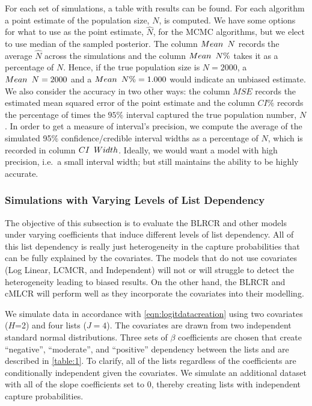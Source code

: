 \documentclass[
  12pt,
]{article}
\begin{document}
For each set of simulations, a table with results can be found. For each
algorithm a point estimate of the population size, \(N\), is computed.
We have some options for what to use as the point estimate, \(\hat{N}\),
for the MCMC algorithms, but we elect to use median of the sampled
posterior. The column \({Mean}\hspace{5px}{N}\) records the average
\(\hat{N}\) across the simulations and the column
\({Mean}\hspace{5px}{N}\%\) takes it as a percentage of \(N\). Hence, if
the true population size is \(N=2000\), a
\({Mean}\hspace{5px}{N} = 2000\) and a
\({Mean}\hspace{5px}{N}\%= 1.000\) would indicate an unbiased estimate.
We also consider the accuracy in two other ways: the column \(MSE\)
records the estimated mean squared error of the point estimate and the
column \(CI \%\) records the percentage of times the \(95\%\) interval
captured the true population number, \(N\). In order to get a measure of
interval's precision, we compute the average of the simulated 95\(\%\)
confidence/credible interval widths as a percentage of \(N\), which is
recorded in column \({CI}\hspace{5px}{Width}\). Ideally, we would want a
model with high precision, i.e.~a small interval width; but still
maintains the ability to be highly accurate.

\subsubsection{Simulations with Varying Levels of List Dependency }
\label{Sec:simslistdepend}

The objective of this subsection is to evaluate the BLRCR and other
models under varying coefficients that induce different levels of list
dependency. All of this list dependency is really just heterogeneity in
the capture probabilities that can be fully explained by the covariates.
The models that do not use covariates (Log Linear, LCMCR, and
Independent) will not or will struggle to detect the heterogeneity
leading to biased results. On the other hand, the BLRCR and cMLCR will
perform well as they incorporate the covariates into their modelling.

We simulate data in accordance with \autoref{eqn:logitdatacreation}
using two covariates (\(H\)=2) and four lists (\(J=4\)). The covariates
are drawn from two independent standard normal distributions. Three sets
of \(\beta\) coefficients are chosen that create ``negative'',
``moderate'', and ``positive'' dependency between the lists and are
described in \autoref{table:1}. To clarify, all of the lists regardless
of the coefficients are conditionally independent given the covariates.
We simulate an additional dataset with all of the slope coefficients set
to 0, thereby creating lists with independent capture probabilities.
\end{document}
